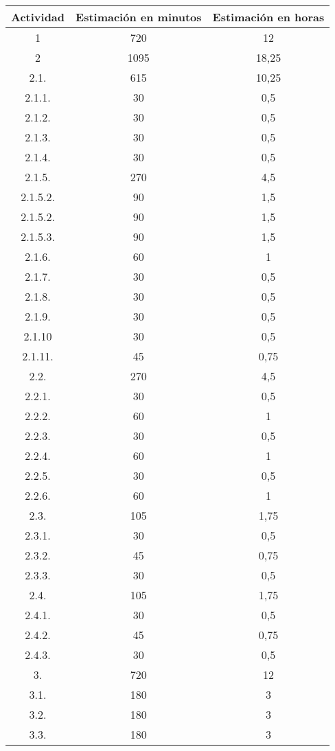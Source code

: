 \begin{longtable}{c|c|c}
\textbf{Actividad} & \textbf{Estimación en minutos} & \textbf{Estimación en horas} \\ \hline
1 & 720 & 12 \\ \hline
2 & 1095 & 18,25 \\ \hline
2.1. & 615 & 10,25 \\ \hline
2.1.1. & 30 & 0,5 \\ \hline
2.1.2. & 30 & 0,5 \\ \hline
2.1.3. & 30 & 0,5 \\ \hline
2.1.4. & 30 & 0,5 \\ \hline
2.1.5. & 270 & 4,5 \\ \hline
2.1.5.2. & 90 & 1,5 \\ \hline
2.1.5.2. & 90 & 1,5 \\ \hline
2.1.5.3. & 90 & 1,5 \\ \hline
2.1.6. & 60 & 1 \\ \hline
2.1.7. & 30 & 0,5 \\ \hline
2.1.8. & 30 & 0,5 \\ \hline
2.1.9. & 30 & 0,5 \\ \hline
2.1.10 & 30 & 0,5 \\ \hline
2.1.11. & 45 & 0,75 \\ \hline
2.2. & 270 & 4,5 \\ \hline
2.2.1. & 30 & 0,5 \\ \hline
2.2.2. & 60 & 1 \\ \hline
2.2.3. & 30 & 0,5 \\ \hline
2.2.4. & 60 & 1 \\ \hline
2.2.5. & 30 & 0,5 \\ \hline
2.2.6. & 60 & 1 \\ \hline
2.3. & 105 & 1,75 \\ \hline
2.3.1. & 30 & 0,5 \\ \hline
2.3.2. & 45 & 0,75 \\ \hline
2.3.3. & 30 & 0,5 \\ \hline
2.4. & 105 & 1,75 \\ \hline
2.4.1. & 30 & 0,5 \\ \hline
2.4.2. & 45 & 0,75 \\ \hline
2.4.3. & 30 & 0,5 \\ \hline
3. & 720 & 12 \\ \hline
3.1. & 180 & 3 \\ \hline
3.2. & 180 & 3 \\ \hline
3.3. & 180 & 3 \\ \hline

\end{longtable}
